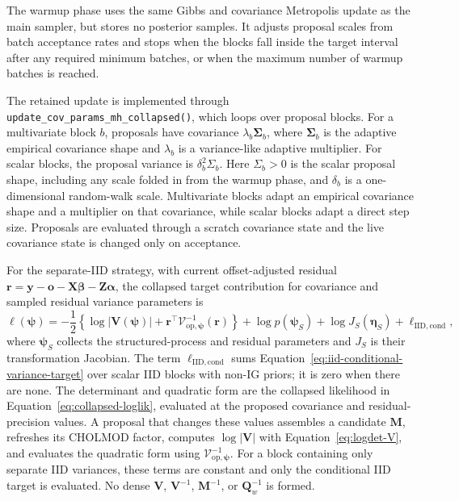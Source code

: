 \documentclass[11pt]{article}
\newcommand{\by}{\bm{y}}
\newcommand{\balpha}{\bm{\alpha}}
\newcommand{\bbeta}{\bm{\beta}}
\newcommand{\br}{\bm{r}}
\newcommand{\bpsi}{\bm{\psi}}
\newcommand{\bo}{\bm{o}}
\newcommand{\bM}{\bm{M}}
\newcommand{\bQ}{\bm{Q}}
\newcommand{\bV}{\bm{V}}
\newcommand{\bX}{\bm{X}}
\newcommand{\bZ}{\bm{Z}}
\newcommand{\bSigma}{\bm{\Sigma}}
\newcommand{\trans}{^\top}
\begin{document}
The warmup phase uses the same Gibbs and covariance Metropolis update as the main sampler, but stores no posterior samples. It adjusts proposal scales from batch acceptance rates and stops when the blocks fall inside the target interval after any required minimum batches, or when the maximum number of warmup batches is reached.

The retained update is implemented through \texttt{update\_cov\_params\_mh\_collapsed()}, which loops over proposal blocks. For a multivariate block $b$, proposals have covariance $\lambda_b \bSigma_b$, where $\bSigma_b$ is the adaptive empirical covariance shape and $\lambda_b$ is a variance-like adaptive multiplier. For scalar blocks, the proposal variance is $\delta_b^2 \Sigma_b$.
Here $\Sigma_b>0$ is the scalar proposal shape, including any scale folded in from the warmup phase, and $\delta_b$ is a one-dimensional random-walk scale. Multivariate blocks adapt an empirical covariance shape and a multiplier on that covariance, while scalar blocks adapt a direct step size. Proposals are evaluated through a scratch covariance state and the live covariance state is changed only on acceptance.

For the separate-IID strategy, with current offset-adjusted residual $\br=\by-\bo-\bX\bbeta-\bZ\balpha$, the collapsed target contribution for covariance and sampled residual variance parameters is
\begin{equation}
  \label{eq:collapsed-mh-target}
  \ell(\bpsi)
  =
  -\frac{1}{2}
  \left\{
    \log|\bV(\bpsi)|
    +
    \br\trans\mathcal{V}^{-1}_{\mathrm{op},\bpsi}(\br)
  \right\}
  + \log p(\bpsi_S)
  + \log J_S(\boldsymbol{\eta}_S)
  + \ell_{\mathrm{IID,cond}},
\end{equation}
where $\bpsi_S$ collects the structured-process and residual parameters and
$J_S$ is their transformation Jacobian. The term $\ell_{\mathrm{IID,cond}}$
sums Equation~\eqref{eq:iid-conditional-variance-target} over scalar IID blocks
with non-IG priors; it is zero when there are none. The determinant and quadratic
form are the collapsed likelihood in Equation~\eqref{eq:collapsed-loglik},
evaluated at the proposed covariance and residual-precision values. A proposal
that changes these values assembles a candidate $\bM$, refreshes its CHOLMOD
factor, computes $\log|\bV|$ with Equation~\eqref{eq:logdet-V}, and evaluates
the quadratic form using $\mathcal{V}^{-1}_{\mathrm{op},\bpsi}$. For a block
containing only separate IID variances, these terms are constant and only the
conditional IID target is evaluated. No dense $\bV$, $\bV^{-1}$, $\bM^{-1}$,
or $\bQ_w^{-1}$ is formed.
\end{document}
